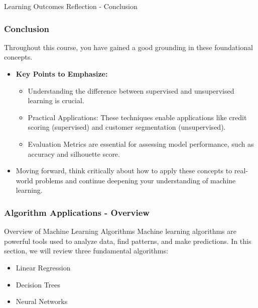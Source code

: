 \documentclass[aspectratio=169]{beamer}
\begin{document}
\begin{frame}[fragile]{Learning Outcomes Reflection - Conclusion}
    \frametitle{Conclusion}
    Throughout this course, you have gained a good grounding in these foundational concepts. 

    \begin{itemize}
        \item \textbf{Key Points to Emphasize:}
        \begin{itemize}
            \item Understanding the difference between supervised and unsupervised learning is crucial.
            \item Practical Applications: These techniques enable applications like credit scoring (supervised) and customer segmentation (unsupervised).
            \item Evaluation Metrics are essential for assessing model performance, such as accuracy and silhouette score.
        \end{itemize}
        
        \item Moving forward, think critically about how to apply these concepts to real-world problems and continue deepening your understanding of machine learning.
    \end{itemize}
\end{frame}

\begin{frame}[fragile]
    \frametitle{Algorithm Applications - Overview}
    \begin{block}{Overview of Machine Learning Algorithms}
        Machine learning algorithms are powerful tools used to analyze data, find patterns, and make predictions. In this section, we will review three fundamental algorithms:
    \end{block}
    \begin{itemize}
        \item Linear Regression
        \item Decision Trees
        \item Neural Networks
    \end{itemize}
\end{frame}
\end{document}
